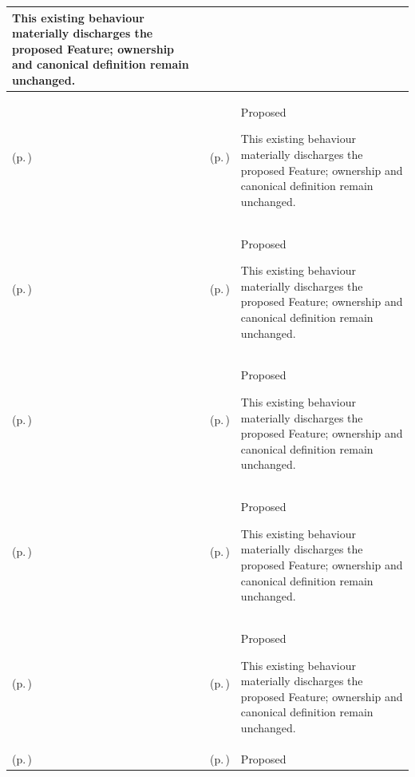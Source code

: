 \begin{longtable}{|>{\raggedright\arraybackslash}p{0.27\TableWidth}|>{\raggedright\arraybackslash}p{0.27\TableWidth}|>{\raggedright\arraybackslash}p{0.46\TableWidth}|}
This existing behaviour materially discharges the proposed Feature; ownership and canonical definition remain unchanged.\\\hline
\nameref{function:manage-ward-capacity} (p.\,\pageref{function:manage-ward-capacity}) & \nameref{feature:ward-care-capacity-management} (p.\,\pageref{feature:ward-care-capacity-management}) & Proposed

This existing behaviour materially discharges the proposed Feature; ownership and canonical definition remain unchanged.\\\hline
\nameref{function:manage-theatre-capacity} (p.\,\pageref{function:manage-theatre-capacity}) & \nameref{feature:theatre-session-capacity-management} (p.\,\pageref{feature:theatre-session-capacity-management}) & Proposed

This existing behaviour materially discharges the proposed Feature; ownership and canonical definition remain unchanged.\\\hline
\nameref{function:coordinate-ed-departmental-capacity} (p.\,\pageref{function:coordinate-ed-departmental-capacity}) & \nameref{feature:emergency-treatment-capacity-management} (p.\,\pageref{feature:emergency-treatment-capacity-management}) & Proposed

This existing behaviour materially discharges the proposed Feature; ownership and canonical definition remain unchanged.\\\hline
\nameref{function:manage-outpatient-capacity} (p.\,\pageref{function:manage-outpatient-capacity}) & \nameref{feature:outpatient-appointment-capacity-management} (p.\,\pageref{feature:outpatient-appointment-capacity-management}) & Proposed

This existing behaviour materially discharges the proposed Feature; ownership and canonical definition remain unchanged.\\\hline
\nameref{function:manage-mobile-service-capacity} (p.\,\pageref{function:manage-mobile-service-capacity}) & \nameref{feature:mobile-service-capacity-management} (p.\,\pageref{feature:mobile-service-capacity-management}) & Proposed

This existing behaviour materially discharges the proposed Feature; ownership and canonical definition remain unchanged.\\\hline
\nameref{function:resolve-associated-binary-content} (p.\,\pageref{function:resolve-associated-binary-content}) & \nameref{feature:binary-content-resolution-assembly} (p.\,\pageref{feature:binary-content-resolution-assembly}) & Proposed


\end{longtable}
